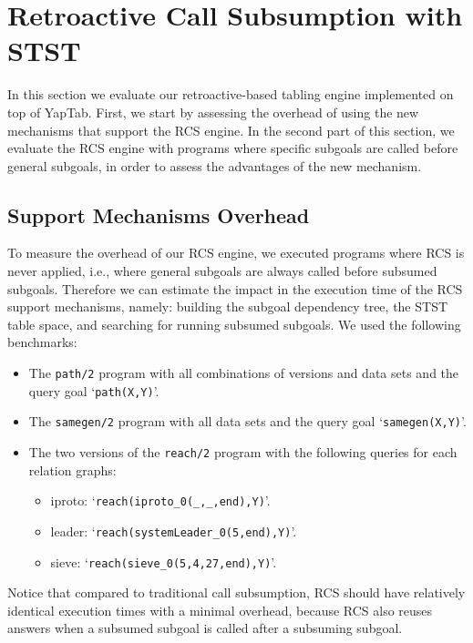 \section{Retroactive Call Subsumption with STST}

In this section we evaluate our retroactive-based tabling engine implemented on
top of YapTab. First, we start by assessing the overhead of using the new mechanisms that
support the RCS engine. In the second part of this section, we evaluate
the RCS engine with programs where specific subgoals are called before general subgoals, in
order to assess the advantages of the new mechanism.

\subsection{Support Mechanisms Overhead}

To measure the overhead of our RCS engine, we executed programs where RCS is never applied, i.e., where
general subgoals are always called before subsumed subgoals. Therefore we can estimate the impact in the
execution time of the RCS support mechanisms, namely: building the subgoal dependency tree, the STST table space,
and searching for running subsumed subgoals.
We used the following benchmarks:

\begin{itemize}
   \item The \texttt{path/2} program with all combinations of versions and data sets and the query goal `\texttt{path(X,Y)}'.
   
   \item The \texttt{samegen/2} program with all data sets and the query goal `\texttt{samegen(X,Y)}'.
   
   \item The two versions of the \texttt{reach/2} program with the following queries for each relation graphs:

   \begin{itemize}
      \item iproto: `\texttt{reach(iproto\_0(\_,\_,end),Y)}'.
      \item leader: `\texttt{reach(systemLeader\_0(5,end),Y)}'.
      \item sieve: `\texttt{reach(sieve\_0(5,4,27,end),Y)}'.
   \end{itemize}

\end{itemize}

Notice that compared to traditional call subsumption, RCS should have
relatively identical execution times with a minimal overhead, because RCS also reuses answers when a subsumed subgoal is
called after a subsuming subgoal.

